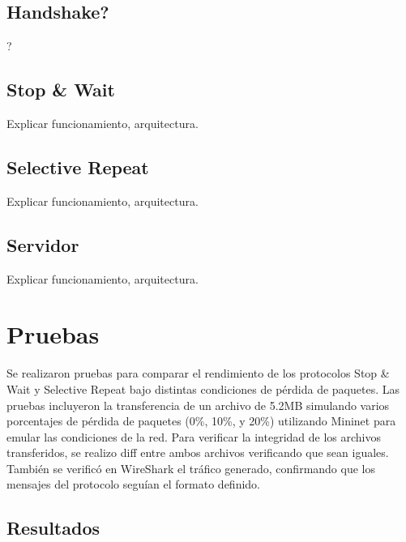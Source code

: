 \documentclass[a4paper,10pt]{article}
\begin{document}
\subsection{Handshake?}
?

\subsection{Stop \& Wait}
Explicar funcionamiento, arquitectura.

\subsection{Selective Repeat}
Explicar funcionamiento, arquitectura.

\subsection{Servidor}
Explicar funcionamiento, arquitectura.

\section{Pruebas}
Se realizaron pruebas para comparar el rendimiento de los protocolos Stop \& Wait y Selective Repeat bajo distintas condiciones de pérdida de paquetes. Las pruebas incluyeron la transferencia de un archivo de 5.2MB simulando varios porcentajes de pérdida de paquetes (0\%, 10\%, y 20\%) utilizando Mininet para emular las condiciones de la red. Para verificar la integridad de los archivos transferidos, se realizo diff entre ambos archivos verificando que sean iguales. También se verificó en WireShark el tráfico generado, confirmando que los mensajes del protocolo seguían el formato definido.

\subsection*{Resultados}
\end{document}
